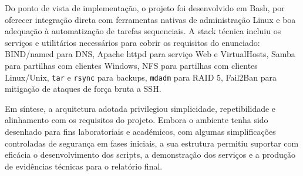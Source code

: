 Do ponto de vista de implementação, o projeto foi desenvolvido  em Bash, por oferecer integração direta com ferramentas nativas de administração Linux e boa adequação à automatização de tarefas sequenciais. A stack técnica incluiu os serviços e utilitários necessários para cobrir os requisitos do enunciado: BIND/named para DNS, Apache httpd para serviço Web e VirtualHosts, Samba para partilhas com clientes Windows, NFS para partilhas com clientes Linux/Unix, \texttt{tar} e \texttt{rsync} para backups, \texttt{mdadm} para RAID 5, Fail2Ban para mitigação de ataques de força bruta a SSH. 

Em síntese, a arquitetura adotada privilegiou simplicidade, repetibilidade e alinhamento com os requisitos do projeto. Embora o ambiente tenha sido desenhado para fins laboratoriais e académicos, com algumas simplificações controladas de segurança em fases iniciais, a sua estrutura permitiu suportar com eficácia o desenvolvimento dos scripts, a demonstração dos serviços e a produção de evidências técnicas para o relatório final.


